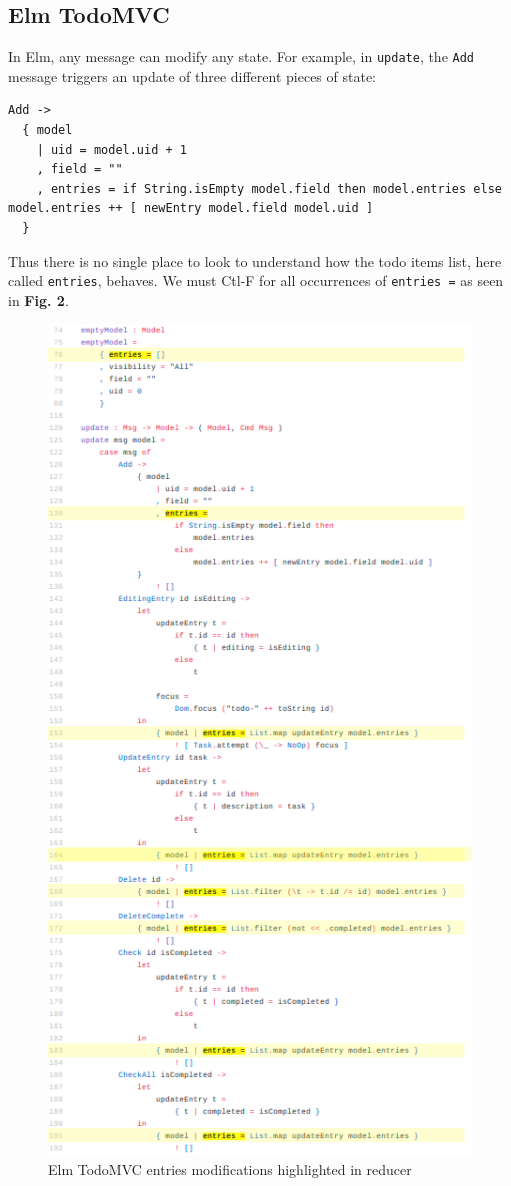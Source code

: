 \documentclass[sigconf]{acmart}
\begin{document}
\subsection{Elm TodoMVC}

In Elm, any message can modify any state. For example, in \lstinline{update},  the \lstinline{Add} message triggers an update of three different pieces of state:

\begin{lstlisting}
Add ->
  { model
    | uid = model.uid + 1
    , field = ""
    , entries = if String.isEmpty model.field then model.entries else model.entries ++ [ newEntry model.field model.uid ]
  }
\end{lstlisting}

Thus there is no single place to look to understand how the todo items list, here called  \lstinline{entries}, behaves. We must Ctl-F for all occurrences of  \lstinline{entries =} as seen in \textbf{Fig. 2}.

\begin{figure}[h]
\includegraphics[scale=0.35]{elm-entries}
\caption{Elm TodoMVC entries modifications highlighted in reducer}
\label{fig:figure 2}
\end{figure}
\end{document}
